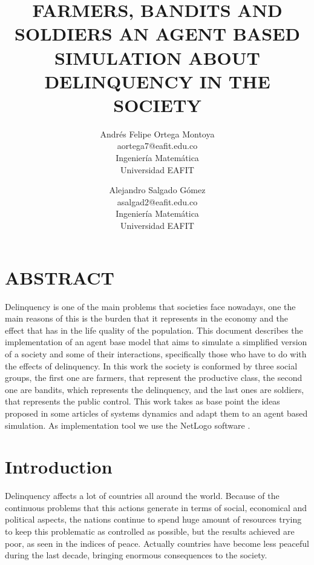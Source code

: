 \documentclass{wscpaperproc}
\begin{document}

\title{FARMERS, BANDITS AND SOLDIERS AN AGENT BASED SIMULATION ABOUT
       DELINQUENCY IN THE SOCIETY}

\author{Andrés Felipe Ortega Montoya\\ [12pt]
aortega7@eafit.edu.co\\
Ingeniería Matemática\\
Universidad EAFIT\\
\and
Alejandro Salgado Gómez\\[12pt]
asalgad2@eafit.edu.co\\
Ingeniería Matemática\\
Universidad EAFIT\\
}

\maketitle

\section*{ABSTRACT}
Delinquency is one of the main problems that societies face nowadays,
one the main reasons of this is the burden that it represents in the
economy and the effect that has in the life quality of the population.
This document describes the implementation of an agent base model that aims to
simulate a simplified version of a society and some of their interactions,
specifically those who have to do with the effects of delinquency.
In this work the society is conformed by three social groups, the
first one are farmers, that represent the productive class, the second
one are bandits, which represents the delinquency, and the last ones
are soldiers, that represents the public control. This work takes as base point
the ideas proposed in some articles of systems dynamics and adapt them to an
agent based simulation. As implementation tool we use the NetLogo software
\cite{netlogo}.

\section{Introduction}

Delinquency affects a lot of countries all around the world. Because of the
continuous problems that this actions generate in terms of social, economical and
political aspects, the nations continue to spend huge amount of resources
trying to keep this problematic as controlled as possible, but the results achieved
are poor, as seen in the indices of peace. Actually countries have become
less peaceful during the last decade, bringing enormous consequences to the
society. \cite{peace} \cite{violence}
\end{document}
